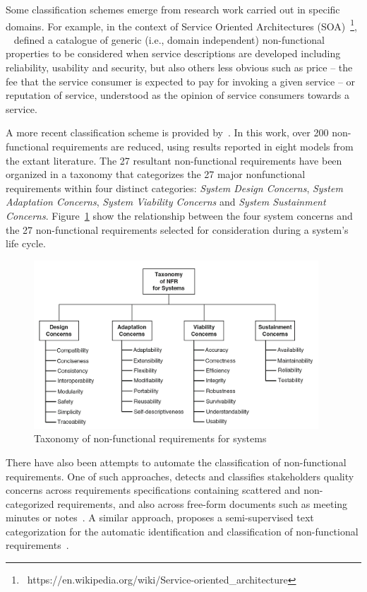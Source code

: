 \documentclass[dissertation,final]{softeng}
\begin{document}
Some classification schemes emerge from research work carried out in specific domains. For example, in the context of Service Oriented Architectures (SOA)~\footnote{~https://en.wikipedia.org/wiki/Service-oriented\_architecture}, ~\citet{Hanane2012} defined a catalogue of generic (i.e., domain independent) non-functional properties to be considered when service descriptions are developed including reliability, usability and security, but also others less obvious such as price -- the fee that the service consumer is expected to pay for invoking a given service -- or reputation of service, understood as the opinion of service consumers towards a service.

A more recent classification scheme is provided by~\citet{adams2015non}. In this work, over 200 non-functional requirements are reduced, using results reported in eight models from the extant literature. The 27 resultant non-functional requirements have been organized in a taxonomy that categorizes the 27 major nonfunctional requirements within four distinct categories: \emph{System Design Concerns}, \emph{System Adaptation Concerns}, \emph{System Viability Concerns} and \emph{System Sustainment Concerns}. Figure~\ref{fig:nfrs_in_systems_design} show the relationship between the four system concerns and the 27 non-functional requirements selected for consideration during a system's life cycle.

\begin{figure}[h]
\includegraphics[width=0.95\textwidth]{nfrs_in_systems_design}
\centering
\caption[Taxonomy of non-functional requirements for systems]{Taxonomy of non-functional requirements for systems~\citep{adams2015non}}
\label{fig:nfrs_in_systems_design}
\end{figure}

There have also been attempts to automate the classification of non-functional requirements. One of such approaches, detects and classifies stakeholders quality concerns across requirements specifications containing scattered and non-categorized requirements, and also across free-form documents such as meeting minutes or notes~\citep{Cleland-Huang:2007}. A similar approach, proposes a semi-supervised text categorization for the automatic identification and classification of non-functional requirements~\citep{Casamayor:2010}.
\end{document}
